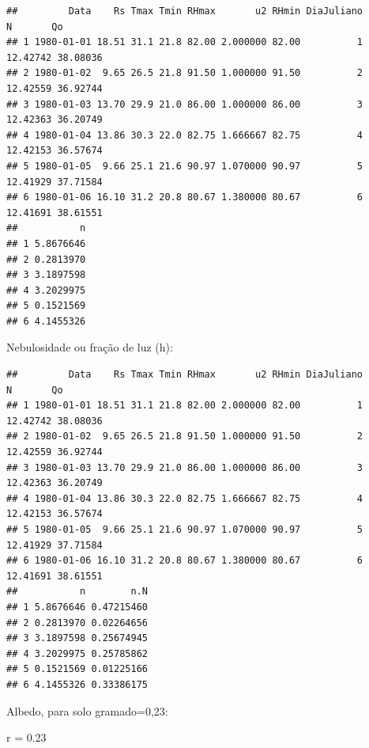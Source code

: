 \documentclass[
]{book}
\newenvironment{Shaded}{\begin{snugshade}}{\end{snugshade}}
\newcommand{\FloatTok}[1]{\textcolor[rgb]{0.00,0.00,0.81}{#1}}
\newcommand{\KeywordTok}[1]{\textcolor[rgb]{0.13,0.29,0.53}{\textbf{#1}}}
\newcommand{\NormalTok}[1]{#1}
\newcommand{\OperatorTok}[1]{\textcolor[rgb]{0.81,0.36,0.00}{\textbf{#1}}}
\newcommand{\StringTok}[1]{\textcolor[rgb]{0.31,0.60,0.02}{#1}}
\begin{document}
\begin{verbatim}
##         Data    Rs Tmax Tmin RHmax       u2 RHmin DiaJuliano        N       Qo
## 1 1980-01-01 18.51 31.1 21.8 82.00 2.000000 82.00          1 12.42742 38.08036
## 2 1980-01-02  9.65 26.5 21.8 91.50 1.000000 91.50          2 12.42559 36.92744
## 3 1980-01-03 13.70 29.9 21.0 86.00 1.000000 86.00          3 12.42363 36.20749
## 4 1980-01-04 13.86 30.3 22.0 82.75 1.666667 82.75          4 12.42153 36.57674
## 5 1980-01-05  9.66 25.1 21.6 90.97 1.070000 90.97          5 12.41929 37.71584
## 6 1980-01-06 16.10 31.2 20.8 80.67 1.380000 80.67          6 12.41691 38.61551
##           n
## 1 5.8676646
## 2 0.2813970
## 3 3.1897598
## 4 3.2029975
## 5 0.1521569
## 6 4.1455326
\end{verbatim}

Nebulosidade ou fração de luz (h):

\begin{Shaded}
\end{Shaded}

\begin{verbatim}
##         Data    Rs Tmax Tmin RHmax       u2 RHmin DiaJuliano        N       Qo
## 1 1980-01-01 18.51 31.1 21.8 82.00 2.000000 82.00          1 12.42742 38.08036
## 2 1980-01-02  9.65 26.5 21.8 91.50 1.000000 91.50          2 12.42559 36.92744
## 3 1980-01-03 13.70 29.9 21.0 86.00 1.000000 86.00          3 12.42363 36.20749
## 4 1980-01-04 13.86 30.3 22.0 82.75 1.666667 82.75          4 12.42153 36.57674
## 5 1980-01-05  9.66 25.1 21.6 90.97 1.070000 90.97          5 12.41929 37.71584
## 6 1980-01-06 16.10 31.2 20.8 80.67 1.380000 80.67          6 12.41691 38.61551
##           n        n.N
## 1 5.8676646 0.47215460
## 2 0.2813970 0.02264656
## 3 3.1897598 0.25674945
## 4 3.2029975 0.25785862
## 5 0.1521569 0.01225166
## 6 4.1455326 0.33386175
\end{verbatim}

Albedo, para solo gramado=0,23:

\begin{Shaded}
\begin{Highlighting}[]
\NormalTok{ r =}\StringTok{ }\FloatTok{0.23} 
\end{Highlighting}
\end{Shaded}
\end{document}
